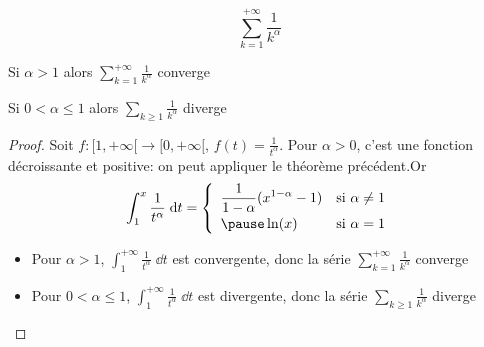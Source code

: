 \begin{frame}


$$\sum_{k = 1}^{+\infty} \frac{1}{k^\alpha}$$

\begin{proposition}
\pause
{}


\pause
{}
\end{proposition}

\end{frame}


\begin{frame}

\begin{proposition}
Si \quad $\alpha >1$ \quad alors \quad $\displaystyle  \sum_{k = 1}^{+\infty} \frac{1}{k^\alpha}$ \quad converge

Si \quad $0 <\alpha \le1$ \quad alors \quad $\displaystyle  \sum_{k \ge 1} \frac{1}{k^\alpha}$ \quad diverge
\end{proposition}

\pause
\begin{proof}
\pause
Soit $f : [1,+\infty[ \to [0,+\infty[$, $f(t)=\frac{1}{t^\alpha}$. \pause Pour $\alpha >0$, c'est une fonction décroissante et positive\pause : on peut appliquer le théorème précédent.\pause Or
$$
\int_1^{x} \frac{1}{t^\alpha}\;\dd t =
\left\{\begin{array}{ll}
\displaystyle{\frac{1}{1-\alpha}(x^{1-\alpha}-1)}&\mbox{si }\alpha\neq
    1\\[1.5ex]
\pause \ln(x) &\mbox{si }\alpha=1
\end{array}\right. 
$$

\begin{itemize}
\item\pause Pour $\alpha > 1$, $\int_1^{+\infty} \frac{1}{t^\alpha} \; \dd t $ 
est convergente, donc la série $\sum_{k = 1}^{+\infty} \frac{1}{k^\alpha}$ converge

\item\pause Pour $0<\alpha\le 1$, $\int_1^{+\infty} \frac{1}{t^\alpha} \; \dd t $ 
est divergente, donc la série $\sum_{k \ge 1} \frac{1}{k^\alpha}$ diverge\qedhere
\end{itemize}
\end{proof}
\end{frame}

